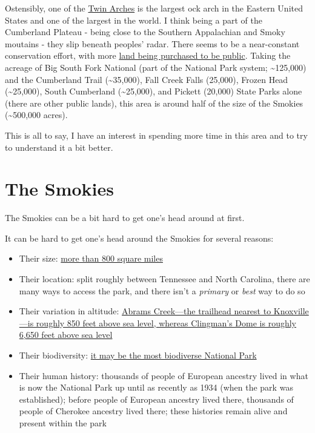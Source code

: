 \documentclass[
]{book}
\providecommand{\tightlist}{%
  \setlength{\itemsep}{0pt}\setlength{\parskip}{0pt}}
\begin{document}
Ostensibly, one of the \href{https://www.tn.gov/environment/program-areas/na-natural-areas/natural-areas-east-region/east-region-/na-na-twin-arches.html}{Twin Arches} is the largest ock arch in the Eastern United States and one of the largest in the world. I think being a part of the Cumberland Plateau - being close to the Southern Appalachian and Smoky moutains - they slip beneath peoples' radar. There seems to be a near-constant conservation effort, with more \href{https://www.knoxnews.com/story/news/2021/09/23/tennessee-skinner-mountain-cumberland-plateau-now-protected/8417864002/}{land being purchased to be public}. Taking the acreage of Big South Fork National (part of the National Park system; \textasciitilde125,000) and the Cumberland Trail (\textasciitilde35,000), Fall Creek Falls (25,000), Frozen Head (\textasciitilde25,000), South Cumberland (\textasciitilde25,000), and Pickett (20,000) State Parks alone (there are other public lands), this area is around half of the size of the Smokies (\textasciitilde500,000 acres).

This is all to say, I have an interest in spending more time in this area and to try to understand it a bit better.

\hypertarget{the-smokies}{%
\section{The Smokies}\label{the-smokies}}

The Smokies can be a bit hard to get one's head around at first.

It can be hard to get one's head around the Smokies for several reasons:

\begin{itemize}
\tightlist
\item
  Their size: \href{https://www.nps.gov/grsm/learn/nature/index.htm}{more than 800 square miles}
\item
  Their location: split roughly between Tennessee and North Carolina, there are many ways to access the park, and there isn't a \emph{primary} or \emph{best} way to do so
\item
  Their variation in altitude: \href{https://www.nps.gov/grsm/learn/nature/mountains.htm}{Abrams Creek---the trailhead nearest to Knoxville---is roughly 850 feet above sea level, whereas Clingman's Dome is roughly 6,650 feet above sea level}
\item
  Their biodiversity: \href{https://www.nps.gov/grsm/learn/nature/index.htm}{it may be the most biodiverse National Park}
\item
  Their human history: thousands of people of European ancestry lived in what is now the National Park up until as recently as 1934 (when the park was established); before people of European ancestry lived there, thousands of people of Cherokee ancestry lived there; these histories remain alive and present within the park
\end{itemize}
\end{document}

